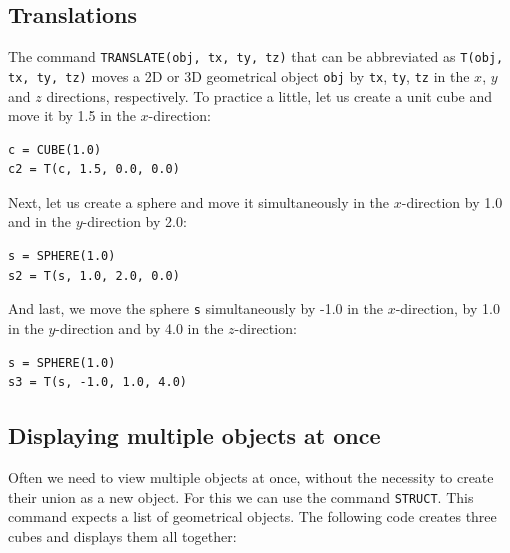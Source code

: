 \subsection{Translations} \label{sec:translate}

The command {\tt TRANSLATE(obj, tx, ty, tz)} that can be abbreviated as 
{\tt T(obj, tx, ty, tz)} moves a 2D or 3D geometrical object {\tt obj} by {\tt tx}, {\tt ty},
{\tt tz} in the $x$, $y$ and $z$ directions, respectively. To practice
a little, let us create a unit cube and move it by 1.5 in the $x$-direction:\\

\begin{bbox}
\begin{verbatim}
c = CUBE(1.0)
c2 = T(c, 1.5, 0.0, 0.0)
\end{verbatim}
\end{bbox}
\vspace{6mm}

\noindent
Next, let us create a sphere and move it simultaneously 
in the $x$-direction by 1.0 and in the $y$-direction by 2.0:\\

\begin{bbox}
\begin{verbatim}
s = SPHERE(1.0)
s2 = T(s, 1.0, 2.0, 0.0)
\end{verbatim}
\end{bbox}
\vspace{6mm}

\noindent
And last, we move the sphere {\tt s} simultaneously by -1.0 in the $x$-direction, 
by 1.0 in the $y$-direction and by 4.0 in the $z$-direction:\\

\begin{bbox}
\begin{verbatim}
s = SPHERE(1.0)
s3 = T(s, -1.0, 1.0, 4.0)
\end{verbatim}
\end{bbox}
\vspace{6mm}

\noindent

\subsection{Displaying multiple objects at once} \label{subsec:mo}

Often we need to view multiple objects at once, without 
the necessity to create their union as a new object. For 
this we can use the command {\tt STRUCT}. This command 
expects a list of geometrical objects. The following 
code creates three cubes and displays them all together:\\

